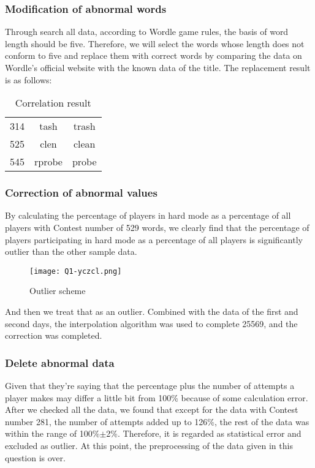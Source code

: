 \documentclass{mcmthesis}
\begin{document}
\subsubsection{Modification of abnormal words}
Through search all data, according to Wordle game rules, the basis of word length should be five. Therefore, we will select the words whose length does not conform to five and replace them with correct words by comparing the data on Wordle's official website with the known data of the title. The replacement result is as follows:
\begin{table}[H]
	\centering
	\renewcommand\arraystretch{1.2}
	\caption{\small Correlation result}
	\begin{tabular}{ccc}
		\toprule[1.5pt]
		\makebox[0.2\textwidth][c]{Contest number} & \makebox[0.25\textwidth][c]{Abnormalword} 
		& \makebox[0.2\textwidth][c]{Revised} \\
		\midrule[1.5pt]
		314 & tash & trash \\
		525 & clen & clean \\
		545 & rprobe & probe \\
		\bottomrule[1.5pt]
	\end{tabular}
\end{table}
\subsubsection{Correction of abnormal values}
By calculating the percentage of players in hard mode as a percentage of all players with Contest number of 529 words, we clearly find that the percentage of players participating in hard mode as a percentage of all players is significantly outlier than the other sample data.
\begin{figure}[H]
	\centering
	\texttt{[image: Q1-yczcl.png]}
	\caption{\small Outlier scheme}
\end{figure}

And then we treat that as an outlier. Combined with the data of the first and second days, the interpolation algorithm was used to complete 25569, and the correction was completed.
\subsubsection{Delete abnormal data}
Given that they're saying that the percentage plus the number of attempts a player makes may differ a little bit from 100\% because of some calculation error. After we checked all the data, we found that except for the data with Contest number 281, the number of attempts added up to 126\%, the rest of the data was within the range of 100\%$\pm$2\%. Therefore, it is regarded as statistical error and excluded as outlier.
At this point, the preprocessing of the data given in this question is over.
\end{document}
